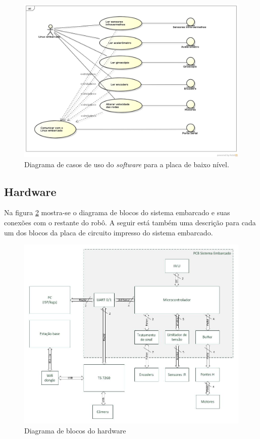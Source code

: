 \begin{figure}[H]
  \centering
  \includegraphics[width=\textwidth, keepaspectratio]{./figuras/sistEmbarcado/usecase_placa_baixo_nivel.jpg}
  \caption{Diagrama de casos de uso do \textit{software} para a placa de baixo nível.}
  \label{fig:diagrama_caso_uso_placa_embarcada}
\end{figure}

\subsection{Hardware}

Na figura \ref{fig:diagrama_blocos_hardware} mostra-se o diagrama de blocos do sistema embarcado e suas conexões com o restante do robô. A seguir está também uma descrição para cada um dos blocos da placa de circuito impresso do sistema embarcado.

\begin{figure}[H]
  \centering
  \includegraphics[width=\textwidth]{./figuras/hardware/diagrama_blocos_hardware.jpg}
  \caption{Diagrama de blocos do hardware}
  \label{fig:diagrama_blocos_hardware}
\end{figure}


